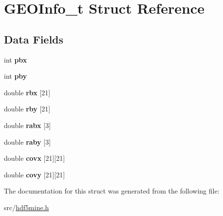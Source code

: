 \hypertarget{structGEOInfo__t}{\section{G\+E\+O\+Info\+\_\+t Struct Reference}
\label{structGEOInfo__t}
}
\subsection*{Data Fields}
\begin{DoxyCompactItemize}
\item 
\hypertarget{structGEOInfo__t_ac69377f10cd7fdff772627d05ad2ac00}{int {\bfseries pbx}}\label{structGEOInfo__t_ac69377f10cd7fdff772627d05ad2ac00}

\item 
\hypertarget{structGEOInfo__t_acb6faf74499759ca4682262b8b883f56}{int {\bfseries pby}}\label{structGEOInfo__t_acb6faf74499759ca4682262b8b883f56}

\item 
\hypertarget{structGEOInfo__t_aa9f98b86b0b86d3c87d0c405c01627b1}{double {\bfseries rbx} \mbox{[}21\mbox{]}}\label{structGEOInfo__t_aa9f98b86b0b86d3c87d0c405c01627b1}

\item 
\hypertarget{structGEOInfo__t_abd1fff6ce76be7a0923c5dc26187f8e4}{double {\bfseries rby} \mbox{[}21\mbox{]}}\label{structGEOInfo__t_abd1fff6ce76be7a0923c5dc26187f8e4}

\item 
\hypertarget{structGEOInfo__t_afcab50ae087ba36a076cd292eb6a58c6}{double {\bfseries rabx} \mbox{[}3\mbox{]}}\label{structGEOInfo__t_afcab50ae087ba36a076cd292eb6a58c6}

\item 
\hypertarget{structGEOInfo__t_a9971e046f4d0c9bfdd52e70653f8ac16}{double {\bfseries raby} \mbox{[}3\mbox{]}}\label{structGEOInfo__t_a9971e046f4d0c9bfdd52e70653f8ac16}

\item 
\hypertarget{structGEOInfo__t_a0483be70c4ffed4dfbfcca832fbc3bc2}{double {\bfseries covx} \mbox{[}21\mbox{]}\mbox{[}21\mbox{]}}\label{structGEOInfo__t_a0483be70c4ffed4dfbfcca832fbc3bc2}

\item 
\hypertarget{structGEOInfo__t_a7135d11d38d19b89412dcf2fb9f87a9a}{double {\bfseries covy} \mbox{[}21\mbox{]}\mbox{[}21\mbox{]}}\label{structGEOInfo__t_a7135d11d38d19b89412dcf2fb9f87a9a}

\end{DoxyCompactItemize}


The documentation for this struct was generated from the following file\+:\begin{DoxyCompactItemize}
\item 
src/\hyperlink{hdf5mine_8h}{hdf5mine.\+h}\end{DoxyCompactItemize}
